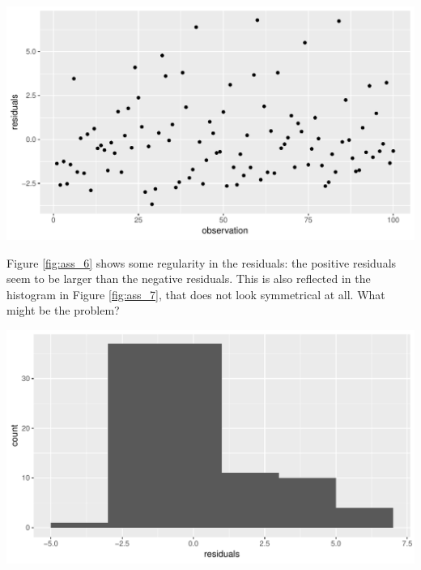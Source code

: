 \documentclass[]{report}\usepackage[]{graphicx}\usepackage[]{color}
\makeatletter
\def\maxwidth{ %
  \ifdim\Gin@nat@width>\linewidth
    \linewidth
  \else
    \Gin@nat@width
  \fi
}
\newenvironment{knitrout}{}{} %
\makeatother
\begin{document}
\begin{knitrout}
\color{fgcolor}

{\centering \includegraphics[width=\maxwidth]{figure/ass_6-1} 

}



\end{knitrout}

Figure \ref{fig:ass_6} shows some regularity in the residuals: the positive residuals seem to be larger than the negative residuals. This is also reflected in the histogram in Figure \ref{fig:ass_7}, that does not look symmetrical at all. What might be the problem?

\begin{knitrout}
\color{fgcolor}

{\centering \includegraphics[width=\maxwidth]{figure/ass_7-1} 

}



\end{knitrout}
\end{document}
